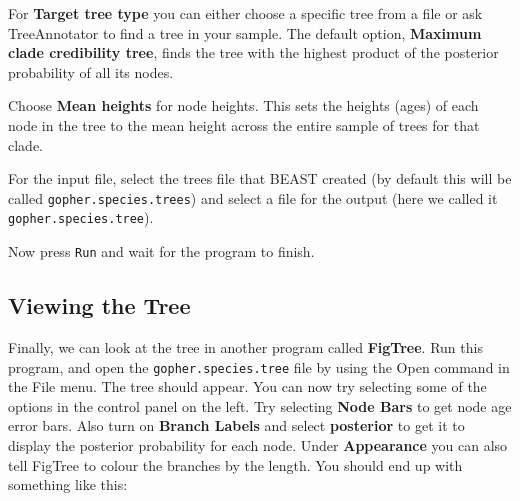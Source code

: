 \documentclass[12pt]{article}
\begin{document}
For {\bf Target tree type} you can either choose a specific tree from a file or ask TreeAnnotator to find a tree in your sample.
The default option, {\bf Maximum clade credibility tree}, finds the tree with the highest product of the posterior probability of
all its nodes.

Choose {\bf Mean heights} for node heights. This sets the heights (ages) of each node in the tree to the mean height across the
entire sample of trees for that clade.

For the input file, select the trees file that BEAST created (by default this will be called \texttt{gopher.species.trees}) and select a file for the
output (here we called it \texttt{gopher.species.tree}).

Now press \texttt{Run} and wait for the program to finish.

\subsection*{Viewing the Tree}
Finally, we can look at the tree in another program called {\bf FigTree}. Run this program, and open
the \texttt{gopher.species.tree} file by using the Open command in the File menu. The tree should appear.
You can now try selecting some of the options in the control panel on the left. Try selecting
{\bf Node Bars} to get node age error bars. Also turn on {\bf Branch Labels} and select {\bf posterior} to get
it to display the posterior probability for each node. Under {\bf Appearance} you can also tell FigTree
to colour the branches by the length.
You should end up with something like this:

\medskip{}

\end{document}
